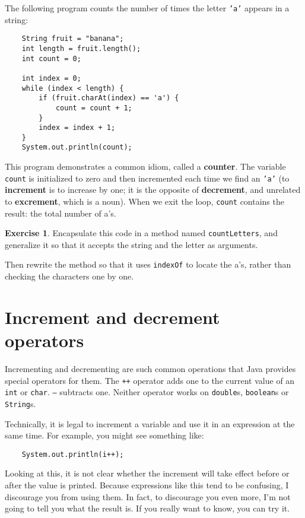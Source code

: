 \documentclass[12pt]{book}
\theoremstyle{definition}
\newtheorem{excz}{Exercise}[chapter]
\newenvironment{exercise}{\bigskip\begin{excz}\mbox{}}{\end{excz}}
\begin{document}
The following program counts the
number of times the letter {\tt 'a'} appears in a string:

\begin{lstlisting}
    String fruit = "banana";
    int length = fruit.length();
    int count = 0;

    int index = 0;
    while (index < length) {
        if (fruit.charAt(index) == 'a') {
            count = count + 1;
        }
        index = index + 1;
    }
    System.out.println(count);
\end{lstlisting}
%
This program demonstrates a common idiom, called a {\bf counter}.  The
variable {\tt count} is initialized to zero and then incremented each
time we find an {\tt 'a'} (to {\bf increment} is to increase by one;
it is the opposite of {\bf decrement}, and unrelated to {\bf
excrement}, which is a noun).  When we exit the loop, {\tt count}
contains the result: the total number of a's.

\begin{exercise}

Encapsulate this code in a method named
{\tt countLetters}, and generalize it so that it accepts the
string and the letter as arguments.

Then rewrite the method so that it uses
{\tt indexOf} to locate the a's, rather than checking
the characters one by one.

\end{exercise}




\section{Increment and decrement operators}

Incrementing and decrementing are such common operations that
Java provides special operators for them.  The {\tt ++}
operator adds one to the current value of an {\tt int} or
{\tt char}.  {\tt --} subtracts one.  Neither operator works
on {\tt double}s, {\tt boolean}s or {\tt String}s.

Technically, it is legal to increment a variable and use it
in an expression at the same time.  For example, you might see
something like:

\begin{lstlisting}
    System.out.println(i++);
\end{lstlisting}
%
Looking at this, it is not clear whether the increment will
take effect before or after the value is printed.  Because
expressions like this tend to be confusing, I discourage
you from using them.  In fact, to discourage you even more,
I'm not going to tell you what the result is.  If you really
want to know, you can try it.
\end{document}
